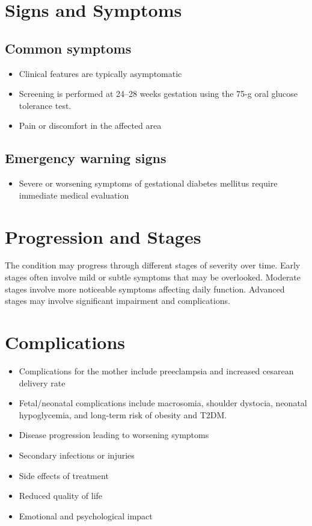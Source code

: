 \section{Signs and Symptoms}

\subsection{Common symptoms}
\begin{itemize}[noitemsep]
  \item Clinical features are typically asymptomatic
  \item Screening is performed at 24--28 weeks gestation using the 75-g oral glucose tolerance test.
  \item Pain or discomfort in the affected area
  \end{itemize}

\subsection{Emergency warning signs}
\begin{itemize}[noitemsep]
  \item Severe or worsening symptoms of gestational diabetes mellitus require immediate medical evaluation
\end{itemize}
\section{Progression and Stages}
The condition may progress through different stages of severity over time. Early stages often involve mild or subtle symptoms that may be overlooked. Moderate stages involve more noticeable symptoms affecting daily function. Advanced stages may involve significant impairment and complications.
\section{Complications}
\begin{itemize}[noitemsep]
  \item Complications for the mother include preeclampsia and increased cesarean delivery rate
  \item Fetal/neonatal complications include macrosomia, shoulder dystocia, neonatal hypoglycemia, and long-term risk of obesity and T2DM.
  \item Disease progression leading to worsening symptoms
  \item Secondary infections or injuries
  \item Side effects of treatment
  \item Reduced quality of life
  \item Emotional and psychological impact
\end{itemize}

